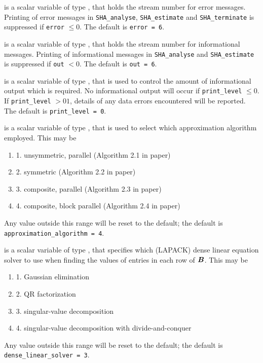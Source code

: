 \documentclass{galahad}
\newcommand{\packagename}{SHA}
\begin{document}
\begin{description}

 is a scalar variable of type \integer, that holds the
stream number for error messages. Printing of error messages in
{\tt \packagename\_analyse},
{\tt \packagename\_estimate}
and {\tt \packagename\_terminate}
is suppressed if {\tt error} $\leq 0$.
The default is {\tt error = 6}.

 is a scalar variable of type \integer, that holds the
stream number for informational messages. Printing of informational messages in
{\tt \packagename\_analyse} and {\tt \packagename\_estimate}
is suppressed if {\tt out} $< 0$.
The default is {\tt out = 6}.

 is a scalar variable of type \integer, that is used
to control the amount of informational output which is required. No
informational output will occur if {\tt print\_level} $\leq 0$. If
{\tt print\_level} $> 01$, details of any data errors encountered
will be reported.
The default is {\tt print\_level = 0}.

 is a scalar variable of type \integer,
that is used to select which approximation algorithm employed. This may be
\begin{enumerate}
\item 1. unsymmetric, parallel (Algorithm 2.1 in paper)
\item 2. symmetric (Algorithm 2.2 in paper)
\item 3. composite, parallel (Algorithm 2.3 in paper)
\item 4. composite, block parallel (Algorithm 2.4 in paper)
\end{enumerate}
Any value outside this range will be reset to the default;
the default is {\tt approximation\_algorithm = 4}.

 is a scalar variable of type \integer,
that specifies which (LAPACK) dense linear equation solver to use when finding
the values of entries in each row of ${\bm{B}}$. This may be
\begin{enumerate}
\item 1. Gaussian elimination
\item 2. QR factorization
\item 3. singular-value decomposition
\item 4. singular-value decomposition with divide-and-conquer
\end{enumerate}
Any value outside this range will be reset to the default;
the default is {\tt dense\_linear\_solver = 3}.


\end{description}
\end{document}
